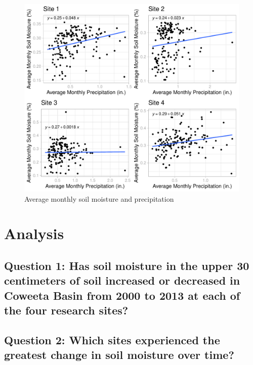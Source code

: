 \documentclass[
  12pt,
]{article}
\begin{document}
\begin{figure}
\centering
\includegraphics{Project_Template_files/figure-latex/Average Monthly Soil Moisture and Precipitation Cowplot-1.pdf}
\caption{Average monthly soil moisture and precipitation}
\end{figure}

\newpage

\hypertarget{analysis}{%
\section{Analysis}\label{analysis}}

\hypertarget{question-1-has-soil-moisture-in-the-upper-30-centimeters-of-soil-increased-or-decreased-in-coweeta-basin-from-2000-to-2013-at-each-of-the-four-research-sites}{%
\subsection{Question 1: Has soil moisture in the upper 30 centimeters of
soil increased or decreased in Coweeta Basin from 2000 to 2013 at each
of the four research
sites?}\label{question-1-has-soil-moisture-in-the-upper-30-centimeters-of-soil-increased-or-decreased-in-coweeta-basin-from-2000-to-2013-at-each-of-the-four-research-sites}}

\hypertarget{question-2-which-sites-experienced-the-greatest-change-in-soil-moisture-over-time}{%
\subsection{Question 2: Which sites experienced the greatest change in
soil moisture over
time?}\label{question-2-which-sites-experienced-the-greatest-change-in-soil-moisture-over-time}}
\end{document}
